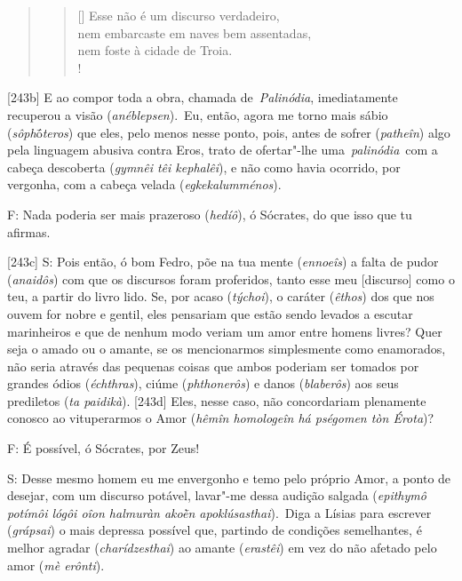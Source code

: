  

\begin{quote}

\begin{verse}[\versewidth]
Esse não é um discurso verdadeiro,\\
 nem embarcaste em naves bem
assentadas,\\
 nem foste à cidade de Troia.\\!
\end{verse} 
\end{quote}

 

[243b] E ao compor toda a obra, chamada de~\emph{Palinódia},
imediatamente recuperou a visão (\emph{anéblepsen}).~Eu, então, agora me
torno mais sábio (\emph{sôph}ṓ\emph{teros}) que eles, pelo menos nesse
ponto, pois, antes de sofrer (\emph{patheîn}) algo pela linguagem
abusiva contra Eros, trato de ofertar"-lhe uma~\emph{palinódia}~com a
cabeça descoberta (\emph{gymnêi têi kephalêi}), e não como havia
ocorrido, por vergonha, com a cabeça velada (\emph{egkekalumménos}).

 

F: Nada poderia ser mais prazeroso (\emph{hedíô}), ó Sócrates, do que
isso que tu afirmas.

 

[243c] S: Pois então, ó bom Fedro, põe na tua mente (\emph{ennoeîs})
a falta de pudor (\emph{anaidôs}) com que os discursos foram proferidos,
tanto esse meu [discurso] como o teu, a partir do livro lido. Se,
por acaso (\emph{týchoi}), o caráter (\emph{êthos}) dos que nos ouvem
for nobre e gentil, eles pensariam que estão sendo levados a escutar
marinheiros e que de nenhum modo veriam um amor entre homens livres?
Quer seja o amado ou o amante, se os mencionarmos simplesmente como
enamorados, não seria através das pequenas coisas que ambos poderiam ser
tomados por grandes ódios (\emph{échthras}), ciúme (\emph{phthonerôs})
e danos (\emph{blaberôs}) aos seus prediletos (\emph{ta paidikà}).
[243d] Eles, nesse caso, não concordariam plenamente conosco ao
vituperarmos o Amor (\emph{hêmîn homologeîn há pségomen tòn Érota})?

 

F: É possível, ó Sócrates, por Zeus!

 

S: Desse mesmo homem eu me envergonho e temo pelo próprio Amor, a ponto
de desejar, com um discurso potável, lavar"-me dessa audição salgada
(\emph{epithymô potímôi lógôi oîon halmuràn akoḕn apoklúsasthai}).~Diga
a Lísias para escrever (\emph{grápsai}) o mais depressa possível que,
partindo de condições semelhantes, é melhor agradar
(\emph{charídzesthai}) ao amante (\emph{erastêi}) em vez do não afetado
pelo amor (\emph{mè erônti}).

